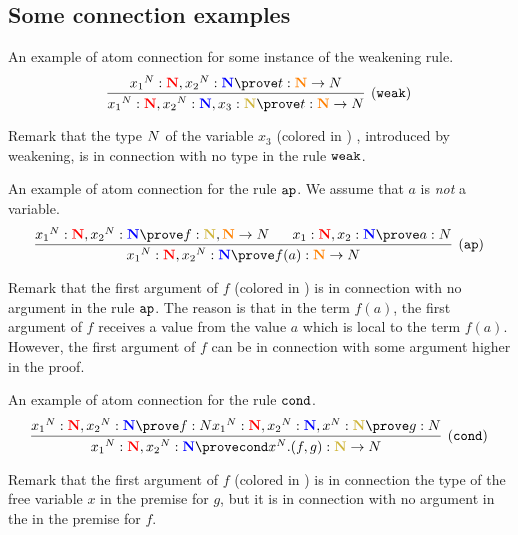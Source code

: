\documentclass{article}
\begin{document}
\subsection{Some connection examples}
\begin{Eg}\label{eg:0}\rm
An example of  atom connection for some instance of the weakening rule.
\[
\infer[(\weak)]
{  {x_1}^\N : \bfColor{red}{\N},{x_2}^\N : \bfColor{blue}{\N}, x_3:\bfColor{oldgold}{\N}
					\prove t : \bfColor{orange}{\N} \rightarrow \N}
	  {   {x_1}^\N : \bfColor{red}{\N},{x_2}^\N : \bfColor{blue}{\N} 
					\prove t : \bfColor{orange}{\N} \rightarrow \N}
\]
\end{Eg}
Remark that the type ${N}$ of the variable $x_3$ (colored in ) , 
introduced by weakening, is in connection with no type in the rule ${\tt weak}$.

\begin{Eg}\label{eg:1}\rm
An example of  atom connection for the rule ${\tt ap}$.
We assume that $a$ is \emph{not} a variable.
\[
\infer[(\ap)]
{  {x_1}^\N : \bfColor{red}{\N},{x_2}^\N : \bfColor{blue}{\N}
					\prove f(a) : \bfColor{orange}{\N} \rightarrow \N}
    {
	  {   {x_1}^\N : \bfColor{red}{\N},{x_2}^\N : \bfColor{blue}{\N}
					\prove f : \bfColor{oldgold}{\N}, \bfColor{orange}{\N} \rightarrow \N}
      {\ \ \ \ \   x_1: \bfColor{red}{\N}, x_2: \bfColor{blue}{\N}
					\prove a : \N}
	}
\]
\end{Eg}
Remark that the first argument of $f$ (colored in ) 
is in connection with no argument in the rule ${\tt ap}$.
The reason is that in the term $f(a)$,
the first argument of $f$ receives a value from the value $a$ which is local to the term $f(a)$.
However, the first argument of $f$ can be in connection with some argument higher in the proof. 

\begin{Eg}\label{eg:2}\rm
An example of  atom connection for the rule ${\tt cond}$.
\[
\infer[(\cond)]
{  {x_1}^\N : \bfColor{red}{\N},{x_2}^\N : \bfColor{blue}{\N}
					\prove \cond x^\N.(f,g) : \bfColor{oldgold}{\N} \rightarrow \N}
    {
      {   {x_1}^\N : \bfColor{red}{\N},{x_2}^\N : \bfColor{blue}{\N}
					\prove f : \N}
	  {   {x_1}^\N : \bfColor{red}{\N},{x_2}^\N : \bfColor{blue}{\N}, x^\N  : \bfColor{oldgold}{\N} 
					\prove g : \N}
    }
\]
\end{Eg}
Remark that the first argument of $f$ (colored in ) 
is in connection the type of the free variable $x$ in the premise for $g$,
but it is in connection with no argument in the  in the premise for $f$.
\end{document}
